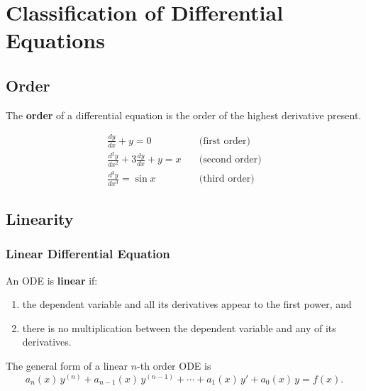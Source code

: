 \chapter{Classification of Differential Equations}

\section{Order}

\begin{definition}[Order]
The \textbf{order} of a differential equation is the order of the highest derivative present.
\end{definition}

\begin{example}
\begin{align*}
  \frac{dy}{dx} + y = 0 &\quad \text{(first order)} \\[6pt]
  \frac{d^2y}{dx^2} + 3\frac{dy}{dx} + y = x &\quad \text{(second order)} \\[6pt]
  \frac{d^3y}{dx^3} = \sin x &\quad \text{(third order)}
\end{align*}
\end{example}

\section{Linearity}

\subsection{Linear Differential Equation}

\begin{definition}
An ODE is \textbf{linear} if:
\begin{enumerate}
  \item the dependent variable and all its derivatives appear to the first power, and
  \item there is no multiplication between the dependent variable and any of its derivatives.
\end{enumerate}
The general form of a linear $n$-th order ODE is
\[
  a_n(x)\,y^{(n)} + a_{n-1}(x)\,y^{(n-1)} + \cdots + a_1(x)\,y' + a_0(x)\,y = f(x).
\]
\end{definition}

